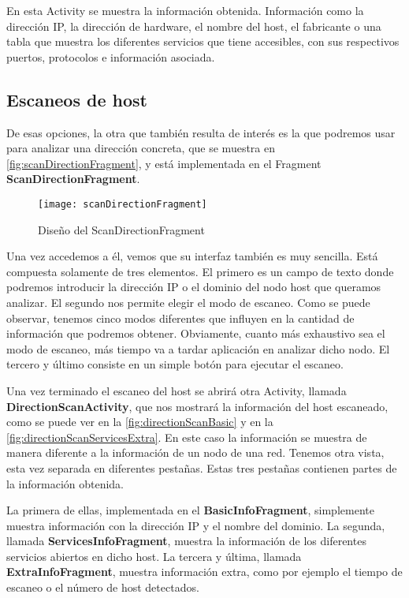 En esta Activity se muestra la información obtenida. Información como la dirección IP,  la dirección de hardware, el nombre del host, el fabricante o una tabla que muestra los diferentes servicios que tiene accesibles, con sus respectivos puertos, protocolos e información asociada.

\subsection{Escaneos de host}

De esas opciones, la otra que también resulta de interés es la que podremos usar para analizar una dirección concreta, que se muestra en \autoref{fig:scanDirectionFragment}, y está implementada en el Fragment \textbf{ScanDirectionFragment}.

\begin{figure}[H]
	\centering
	\texttt{[image: scanDirectionFragment]}
	\caption{Diseño del ScanDirectionFragment}
	\label{fig:scanDirectionFragment}
\end{figure}

Una vez accedemos a él, vemos que su interfaz también es muy sencilla. Está compuesta solamente de tres elementos. El primero es un campo de texto donde podremos introducir la dirección IP o el dominio del nodo host que queramos analizar. El segundo nos permite elegir el modo de escaneo. Como se puede observar, tenemos cinco modos diferentes que influyen en la cantidad de información que podremos obtener. Obviamente, cuanto más exhaustivo sea el modo de escaneo, más tiempo va a tardar aplicación en analizar dicho nodo. El tercero y último consiste en un simple botón para ejecutar el escaneo.

Una vez terminado el escaneo del host se abrirá otra Activity, llamada \textbf{DirectionScanActivity}, que nos mostrará la información del host escaneado, como se puede ver en la \autoref{fig:directionScanBasic} y en la \autoref{fig:directionScanServicesExtra}. En este caso la información se muestra de manera diferente a la información de un nodo de una red. Tenemos otra vista, esta vez separada en diferentes pestañas. Estas tres pestañas contienen partes de la información obtenida.

La primera de ellas, implementada en el \textbf{BasicInfoFragment}, simplemente muestra información con la dirección IP y el nombre del dominio. La segunda, llamada \textbf{ServicesInfoFragment}, muestra la información de los diferentes servicios abiertos en dicho host. La tercera y última, llamada \textbf{ExtraInfoFragment}, muestra información extra, como por ejemplo el tiempo de escaneo o el número de host detectados.

